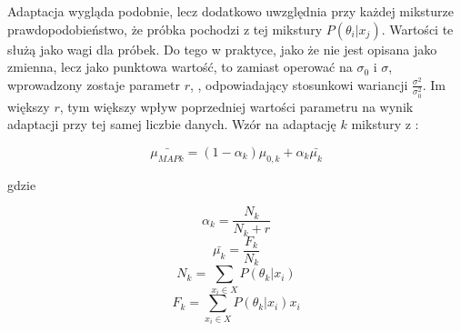 Adaptacja  wygląda podobnie, lecz dodatkowo uwzględnia przy każdej miksturze prawdopodobieństwo,
że próbka pochodzi z tej mikstury $P(\theta_i | x_j)$. Wartości te służą jako wagi dla próbek. Do tego w
praktyce, jako że  nie jest opisana jako zmienna, lecz jako punktowa wartość, to zamiast
operować na $\sigma_0$ i $\sigma$, wprowadzony zostaje parametr $r$, , odpowiadający
stosunkowi wariancji $\frac{\sigma^2}{\sigma_0^2}$. Im większy $r$, tym większy wpływ poprzedniej wartości
parametru na wynik adaptacji przy tej samej liczbie danych. Wzór na adaptację $k$ mikstury z \cite{comparisonOfMultiple}: 

$$\bar{\mu_{MAP k}} = (1 - \alpha_k) \mu_{0,k} + \alpha_k \bar{\mu_k}$$

gdzie 

$$\alpha_k = \frac{N_k}{N_k + r}$$
$$\bar{\mu_k} = \frac{F_k}{N_k}$$
$$N_k = \sum_{x_i \in X} P(\theta_k | x_i)$$
$$F_k = \sum_{x_i \in X} P(\theta_k | x_i) x_i$$



%

%
%
%
%
%


